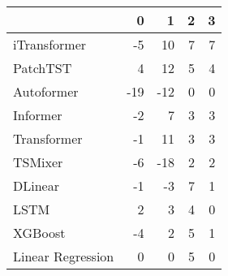 \begin{tabular}{lrrrr}
\toprule
 & 0 & 1 & 2 & 3 \\
\midrule
iTransformer & -5 & 10 & 7 & 7 \\
PatchTST & 4 & 12 & 5 & 4 \\
Autoformer & -19 & -12 & 0 & 0 \\
Informer & -2 & 7 & 3 & 3 \\
Transformer & -1 & 11 & 3 & 3 \\
TSMixer & -6 & -18 & 2 & 2 \\
DLinear & -1 & -3 & 7 & 1 \\
LSTM & 2 & 3 & 4 & 0 \\
XGBoost & -4 & 2 & 5 & 1 \\
Linear Regression & 0 & 0 & 5 & 0 \\
\bottomrule
\end{tabular}
